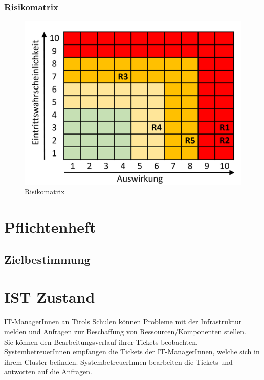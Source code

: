 \subsubsection{Risikomatrix}
\begin{figure}[h]
	\centering
	\includegraphics[scale=0.6]{figures/matrix.png}
	\caption{Risikomatrix}
	\label{Abb_Risikomatrix}
\end{figure}


\newpage
\section{Pflichtenheft}
\subsection{Zielbestimmung}
\section{IST Zustand}
IT-ManagerInnen an Tirols Schulen können Probleme mit der Infrastruktur melden und Anfragen zur Beschaffung von Ressourcen/Komponenten stellen.
\\
Sie können den Bearbeitungsverlauf ihrer Tickets beobachten. SystembetreuerInnen empfangen die Tickets der IT-ManagerInnen, welche sich in ihrem Cluster befinden. SystembetreuerInnen bearbeiten die Tickets und antworten auf die Anfragen.

